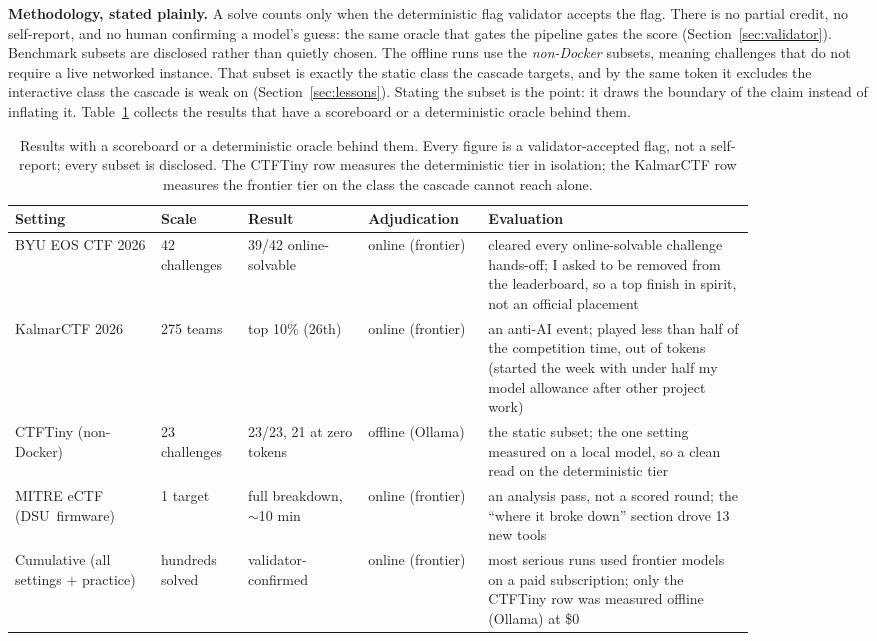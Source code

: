 \documentclass[10pt,twocolumn]{article}
\begin{document}
\textbf{Methodology, stated plainly.} A solve counts only when the deterministic flag validator accepts the
flag. There is no partial credit, no self-report, and no human confirming a model's guess: the same oracle
that gates the pipeline gates the score (Section~\ref{sec:validator}). Benchmark subsets are disclosed rather
than quietly chosen. The offline runs use the \emph{non-Docker} subsets, meaning challenges that do not
require a live networked instance. That subset is exactly the static class the cascade targets, and by the
same token it excludes the interactive class the cascade is weak on (Section~\ref{sec:lessons}). Stating the
subset is the point: it draws the boundary of the claim instead of inflating it. Table~\ref{tab:eval}
collects the results that have a scoreboard or a deterministic oracle behind them.

\begin{table}[t]
  \centering\small
  \setlength{\tabcolsep}{7pt}\renewcommand{\arraystretch}{1.5}
  \begin{tabular}{@{}p{0.17\linewidth} p{0.10\linewidth} p{0.14\linewidth} p{0.135\linewidth} p{0.315\linewidth}@{}}
    \toprule
    \textbf{Setting} & \textbf{Scale} & \textbf{Result} & \textbf{Adjudication} & \textbf{Evaluation} \\
    \midrule
    BYU EOS CTF 2026 & 42 challenges & 39/42 online-solvable & online \mbox{(frontier)} & cleared every online-solvable challenge hands-off; I asked to be removed from the leaderboard, so a top finish in spirit, not an official placement \\
    KalmarCTF 2026 & 275 teams & top 10\% (26th) & online \mbox{(frontier)} & an anti-AI event; played less than half of the competition time, out of tokens (started the week with under half my model allowance after other project work) \\
    \mbox{CTFTiny} \mbox{(non-Docker)} & 23 challenges & 23/23, 21 at zero tokens & offline \mbox{(Ollama)} & the static subset; the one setting measured on a local model, so a clean read on the deterministic tier \\
    MITRE eCTF \mbox{(DSU firmware)} & 1 target & full breakdown, $\sim$10 min & online \mbox{(frontier)} & an analysis pass, not a scored round; the ``where it broke down'' section drove 13 new tools \\
    Cumulative (all settings + practice) & hundreds solved & validator-confirmed & online \mbox{(frontier)} & most serious runs used frontier models on a paid subscription; only the CTFTiny row was measured offline (Ollama) at \$0 \\
    \bottomrule
  \end{tabular}
  \caption{Results with a scoreboard or a deterministic oracle behind them. Every figure is a
  validator-accepted flag, not a self-report; every subset is disclosed. The CTFTiny row measures the
  deterministic tier in isolation; the KalmarCTF row measures the frontier tier on the class the cascade
  cannot reach alone.}
  \label{tab:eval}
\end{table}
\end{document}
